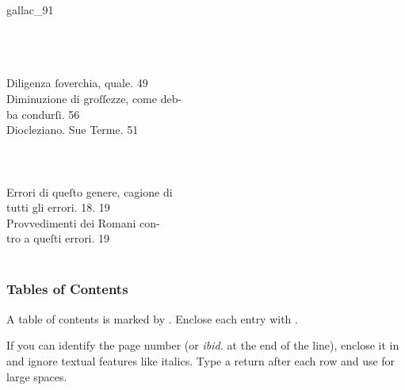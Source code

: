 
\begin{sampleImage}[ 2]{gallac_91}

\begin{typeLatin}
 \\
 \\
\someText \\
Diligenza ſoverchia, quale.  49 \\
Diminuzione di groſſezze, come deb- \\
 ba condurſi.  56 \\
Diocleziano. Sue Terme.  51  \\
\someText \\
 \\
\someText \\
Errori di queſto genere, cagione di \\
 tutti gli errori.  18. 19 \\
 Provvedimenti dei Romani con- \\
 tro a queſti errori.  19 \\
\someText \\
\end{typeLatin}
\end{sampleImage}


\subsubsection{Tables of Contents}
\label{section tables of contents}

\begin{mainrule}
  A table of contents is marked by . Enclose each entry with .

  If you can identify the page number (or \emph{ibid.} at the end of the line), enclose it in  and ignore textual features like italics. Type a return after each row and use  for large spaces.
\end{mainrule}


